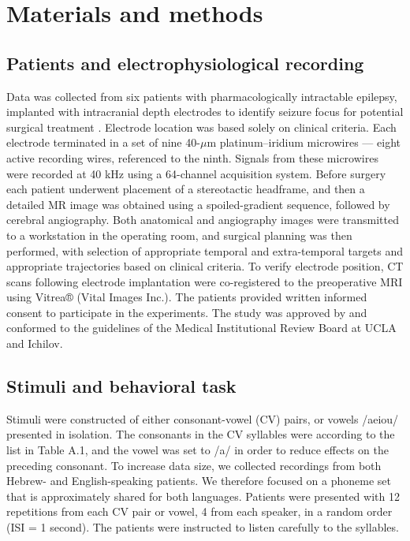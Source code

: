 \section{Materials and methods}
\subsection{Patients and electrophysiological recording}
Data was collected from six patients with pharmacologically intractable epilepsy, implanted with intracranial depth electrodes to identify seizure focus for potential surgical treatment \citep{mukamel2012human}. Electrode location was based solely on clinical criteria. Each electrode terminated in a set of nine 40-$\mu$m platinum–iridium microwires \citep{fried1999cerebral} — eight active recording wires, referenced to the ninth. Signals from these microwires were recorded at 40 kHz using a 64-channel acquisition system. Before surgery each patient underwent placement of a stereotactic headframe, and then a detailed MR image was obtained using a spoiled-gradient sequence, followed by cerebral angiography. Both anatomical and angiography images were transmitted to a workstation in the operating room, and surgical planning was then performed, with selection of appropriate temporal and extra-temporal targets and appropriate trajectories based on clinical criteria. To verify electrode position, CT scans following electrode implantation were co-registered to the preoperative MRI using Vitrea® (Vital Images Inc.). The patients provided written informed consent to participate in the experiments. The study was approved by and conformed to the guidelines of the Medical Institutional Review Board at UCLA and Ichilov.

\subsection{Stimuli and behavioral task}
Stimuli were constructed of either consonant-vowel (CV) pairs, or vowels /aeiou/ presented in isolation. The consonants in the CV syllables were according to the list in Table A.1, and the vowel was set to /a/ in order to reduce effects on the preceding consonant. To increase data size, we collected recordings from both Hebrew- and English-speaking patients. We therefore focused on a phoneme set that is approximately shared for both languages. Patients  were presented with 12 repetitions from each CV pair or vowel, 4 from each speaker, in a random order (ISI = 1 second). The patients were instructed to listen carefully to the syllables.


